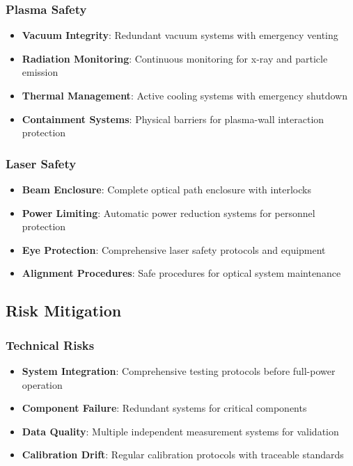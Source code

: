 \documentclass[12pt,a4paper]{article}
\begin{document}
\subsubsection{Plasma Safety}
\begin{itemize}
\item \textbf{Vacuum Integrity}: Redundant vacuum systems with emergency venting
\item \textbf{Radiation Monitoring}: Continuous monitoring for x-ray and particle emission
\item \textbf{Thermal Management}: Active cooling systems with emergency shutdown
\item \textbf{Containment Systems}: Physical barriers for plasma-wall interaction protection
\end{itemize}

\subsubsection{Laser Safety}
\begin{itemize}
\item \textbf{Beam Enclosure}: Complete optical path enclosure with interlocks
\item \textbf{Power Limiting}: Automatic power reduction systems for personnel protection
\item \textbf{Eye Protection}: Comprehensive laser safety protocols and equipment
\item \textbf{Alignment Procedures}: Safe procedures for optical system maintenance
\end{itemize}

\subsection{Risk Mitigation}

\subsubsection{Technical Risks}
\begin{itemize}
\item \textbf{System Integration}: Comprehensive testing protocols before full-power operation
\item \textbf{Component Failure}: Redundant systems for critical components
\item \textbf{Data Quality}: Multiple independent measurement systems for validation
\item \textbf{Calibration Drift}: Regular calibration protocols with traceable standards
\end{itemize}
\end{document}
